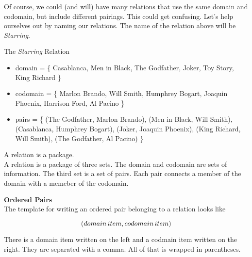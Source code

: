 \documentclass{ximera}
\begin{document}
Of course, we could (and will) have many relations that use the same domain and codomain, but include different pairings. This could get confusing.  Let's help ourselves out by naming our relations.  The name of the relation above will be \textit{Starring}.


\begin{example} The \textit{Starring} Relation\\
\begin{itemize}
\item domain = \{ Casablanca, Men in Black,  The Godfather, Joker, Toy Story, King Richard \}  
\item codomain = \{ Marlon Brando, Will Smith, Humphrey Bogart, Joaquin Phoenix, Harrison Ford, Al Pacino  \} 
\item pairs = \{ (The Godfather, Marlon Brando), (Men in Black, Will Smith), (Casablanca, Humphrey Bogart), (Joker, Joaquin Phoenix), (King Richard, Will Smith), (The Godfather, Al Pacino) \} 
\end{itemize}
\end{example}


A relation is a package.  \\

A relation is a package of three sets. The domain and codomain are sets of information.  The third set is a set of pairs.  Each pair connects a member of the domain with a memeber of the codomain. 


\begin{template} \textbf{\textcolor{purple!85!blue}{Ordered Pairs}}  \\
The template for writing an ordered pair belonging to a relation looks like  

\[
\large{( domain \, item, codomain \, item )}
\]
\end{template}

There is a domain item written on the left and a codmain item written on the right.  They are separated with a comma.  All of that is wrapped in parentheses.












\newpage
\end{document}
